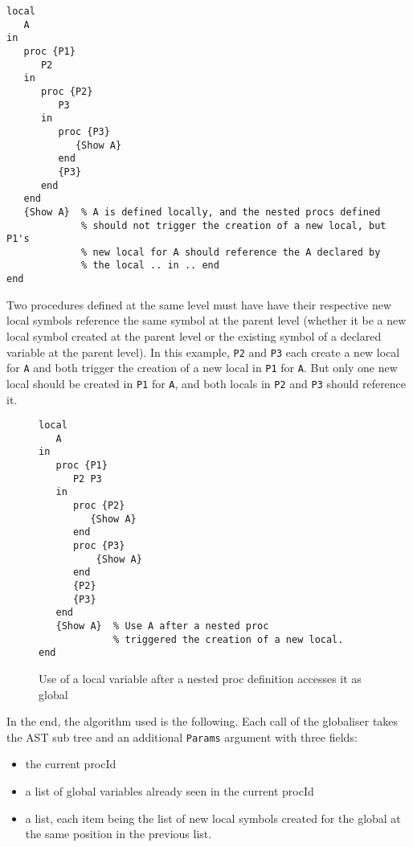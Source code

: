 \documentclass[a4paper]{memoir}
\begin{document}
\begin{lstlisting}
local
   A
in
   proc {P1}
      P2
   in
      proc {P2}
         P3
      in
         proc {P3}
            {Show A}
         end
         {P3}
      end
   end
   {Show A}  % A is defined locally, and the nested procs defined 
             % should not trigger the creation of a new local, but P1's
             % new local for A should reference the A declared by 
             % the local .. in .. end
end
\end{lstlisting}

Two procedures defined at the same level must have have their respective new local symbols reference the same symbol at the parent level (whether it be a new local symbol created at the parent level or the existing symbol of a declared variable at the parent level). In this example, \lstinline!P2! and \lstinline!P3! each create a new local for \lstinline!A! and both trigger the creation of a new local in \lstinline!P1! for \lstinline!A!. But only one new local should be created in \lstinline!P1! for \lstinline!A!, and both locals in \lstinline!P2! and \lstinline!P3! should reference it.


\begin{figure}[h]
\begin{lstlisting}
local
   A
in
   proc {P1}
      P2 P3
   in
      proc {P2}
         {Show A}
      end
      proc {P3}
          {Show A}
      end
      {P2}
      {P3}
   end
   {Show A}  % Use A after a nested proc 
             % triggered the creation of a new local.
end
\end{lstlisting}
\caption{Use of a local variable after a nested proc definition accesses it as
global}
\label{fig:globaliser:examplev}
\end{figure}


In the end, the algorithm used is the following.
Each call of the globaliser takes the AST sub tree and an additional \lstinline!Params! argument with three fields:
\begin{itemize}
   \item the current procId
   \item a list of global variables already seen in the current procId
   \item a list, each item being the list of new local symbols created for the
     global at the same position in the previous list.
\end{itemize}
\end{document}
